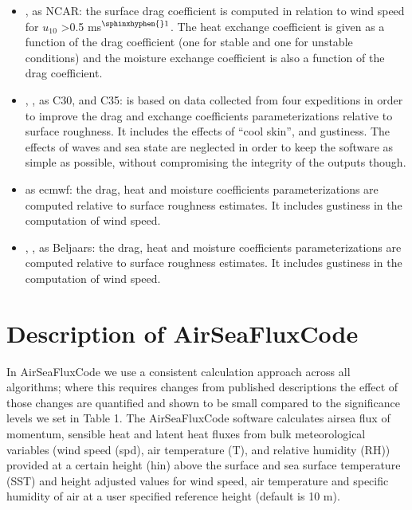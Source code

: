 \documentclass[letterpaper,10pt,english]{sphinxmanual}
\begin{document}
\begin{itemize}
\item {}
\sphinxAtStartPar
{},  as NCAR: the surface drag coefficient is computed in relation to wind speed for \(u_{10}\) \textgreater{}0.5 ms$^{\text{\sphinxhyphen{}1}}$. The heat exchange coefficient is given as a function of the drag coefficient (one for stable and one for unstable conditions) and the moisture exchange coefficient is also a function of the drag coefficient.

\item {}
\sphinxAtStartPar
{}, ,  as C30, and C35: is based on data collected from four expeditions in order to improve the drag and exchange coefficients parameterizations relative to surface roughness. It includes the effects of “cool skin”, and gustiness. The effects of waves and sea state are neglected in order to keep the software as simple as possible, without compromising the integrity of the outputs though.

\item {}
\sphinxAtStartPar
{} as ecmwf: the drag, heat and moisture coefficients parameterizations are computed relative to surface roughness estimates. It includes gustiness in the computation of wind speed.

\item {}
\sphinxAtStartPar
{}, ,  as Beljaars: the drag, heat and moisture coefficients parameterizations are computed relative to surface roughness estimates. It includes gustiness in the computation of wind speed.

\end{itemize}


\section{Description of AirSeaFluxCode}
\label{\detokenize{users_guide:description-of-airseafluxcode}}
\sphinxAtStartPar
In AirSeaFluxCode we use a consistent calculation approach across all algorithms; where this requires changes from published descriptions the effect of those changes are quantified and shown to be small compared to the significance levels we set in Table 1. The AirSeaFluxCode software calculates air\sphinxhyphen{}sea flux of momentum, sensible heat and latent heat fluxes from bulk meteorological variables (wind speed (spd), air temperature (T), and relative humidity (RH)) provided at a certain height (hin) above the surface and sea surface temperature (SST) and height adjusted values for wind speed, air temperature and specific humidity of air at a user specified reference height (default is 10 m).
\end{document}
